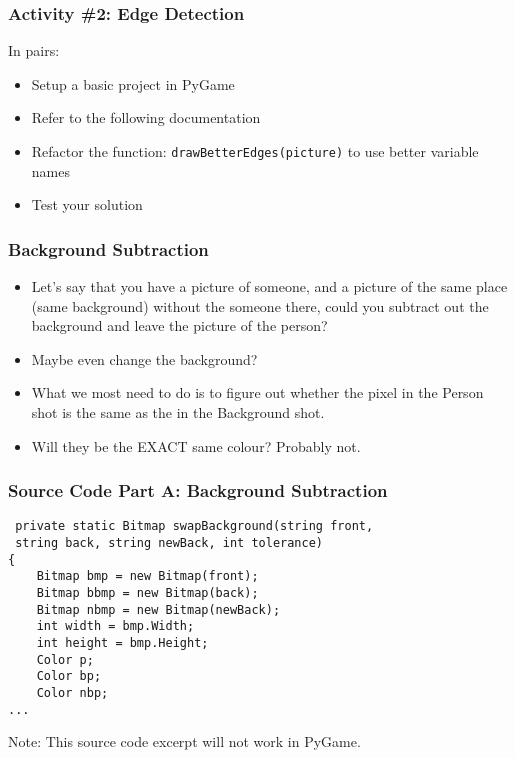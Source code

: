 
\begin{frame}
	\frametitle{Activity \#2: Edge Detection}
	
	In pairs:
	
	\vspace{2em}
	
	\begin{itemize}		
		\item Setup a basic project in PyGame
		\item Refer to the following documentation
		\item Refactor the function: \texttt{drawBetterEdges(picture)} to use better variable names
		\item Test your solution
	\end{itemize}
\end{frame}

\begin{frame}
	\frametitle{Background Subtraction}
	
	\begin{itemize}		
		\item Let's say that you have a picture of someone, and a picture of the same place (same background) without the someone there,
		could you subtract out the background and leave the picture of the person?
		\item Maybe even change the background?
		\item What we most need to do is to figure out whether the pixel in the Person shot is the same as the in the Background shot.
		\item Will they be the EXACT same colour?  Probably not.
	\end{itemize}
\end{frame}

\begin{frame}[fragile]
	\frametitle{Source Code Part A: Background Subtraction}
	
\begin{lstlisting}
 private static Bitmap swapBackground(string front, 
 string back, string newBack, int tolerance)
{
	Bitmap bmp = new Bitmap(front);
	Bitmap bbmp = new Bitmap(back);
	Bitmap nbmp = new Bitmap(newBack);
	int width = bmp.Width;
	int height = bmp.Height;
	Color p;
	Color bp;
	Color nbp;
...
\end{lstlisting}

Note: This source code excerpt will not work in PyGame.

\end{frame}

